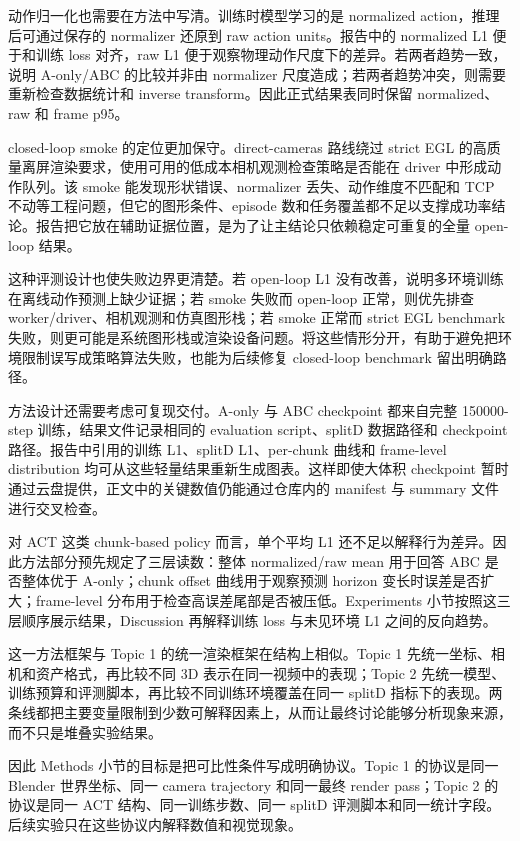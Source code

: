 \documentclass{article}
\begin{document}
	动作归一化也需要在方法中写清。训练时模型学习的是 normalized action，推理后可通过保存的 normalizer 还原到 raw action units。报告中的 normalized L1 便于和训练 loss 对齐，raw L1 便于观察物理动作尺度下的差异。若两者趋势一致，说明 A-only/ABC 的比较并非由 normalizer 尺度造成；若两者趋势冲突，则需要重新检查数据统计和 inverse transform。因此正式结果表同时保留 normalized、raw 和 frame p95。

	closed-loop smoke 的定位更加保守。direct-cameras 路线绕过 strict EGL 的高质量离屏渲染要求，使用可用的低成本相机观测检查策略是否能在 driver 中形成动作队列。该 smoke 能发现形状错误、normalizer 丢失、动作维度不匹配和 TCP 不动等工程问题，但它的图形条件、episode 数和任务覆盖都不足以支撑成功率结论。报告把它放在辅助证据位置，是为了让主结论只依赖稳定可重复的全量 open-loop 结果。

	这种评测设计也使失败边界更清楚。若 open-loop L1 没有改善，说明多环境训练在离线动作预测上缺少证据；若 smoke 失败而 open-loop 正常，则优先排查 worker/driver、相机观测和仿真图形栈；若 smoke 正常而 strict EGL benchmark 失败，则更可能是系统图形栈或渲染设备问题。将这些情形分开，有助于避免把环境限制误写成策略算法失败，也能为后续修复 closed-loop benchmark 留出明确路径。

	方法设计还需要考虑可复现交付。A-only 与 ABC checkpoint 都来自完整 150000-step 训练，结果文件记录相同的 evaluation script、splitD 数据路径和 checkpoint 路径。报告中引用的训练 L1、splitD L1、per-chunk 曲线和 frame-level distribution 均可从这些轻量结果重新生成图表。这样即使大体积 checkpoint 暂时通过云盘提供，正文中的关键数值仍能通过仓库内的 manifest 与 summary 文件进行交叉检查。

	对 ACT 这类 chunk-based policy 而言，单个平均 L1 还不足以解释行为差异。因此方法部分预先规定了三层读数：整体 normalized/raw mean 用于回答 ABC 是否整体优于 A-only；chunk offset 曲线用于观察预测 horizon 变长时误差是否扩大；frame-level 分布用于检查高误差尾部是否被压低。Experiments 小节按照这三层顺序展示结果，Discussion 再解释训练 loss 与未见环境 L1 之间的反向趋势。

	这一方法框架与 Topic 1 的统一渲染框架在结构上相似。Topic 1 先统一坐标、相机和资产格式，再比较不同 3D 表示在同一视频中的表现；Topic 2 先统一模型、训练预算和评测脚本，再比较不同训练环境覆盖在同一 splitD 指标下的表现。两条线都把主要变量限制到少数可解释因素上，从而让最终讨论能够分析现象来源，而不只是堆叠实验结果。

	因此 Methods 小节的目标是把可比性条件写成明确协议。Topic 1 的协议是同一 Blender 世界坐标、同一 camera trajectory 和同一最终 render pass；Topic 2 的协议是同一 ACT 结构、同一训练步数、同一 splitD 评测脚本和同一统计字段。后续实验只在这些协议内解释数值和视觉现象。
\end{document}
